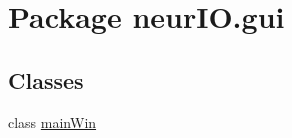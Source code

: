 \hypertarget{namespaceneur_i_o_1_1gui}{}\section{Package neur\+I\+O.\+gui}
\label{namespaceneur_i_o_1_1gui}
\subsection*{Classes}
\begin{DoxyCompactItemize}
\item 
class \hyperlink{classneur_i_o_1_1gui_1_1main_win}{main\+Win}
\end{DoxyCompactItemize}
